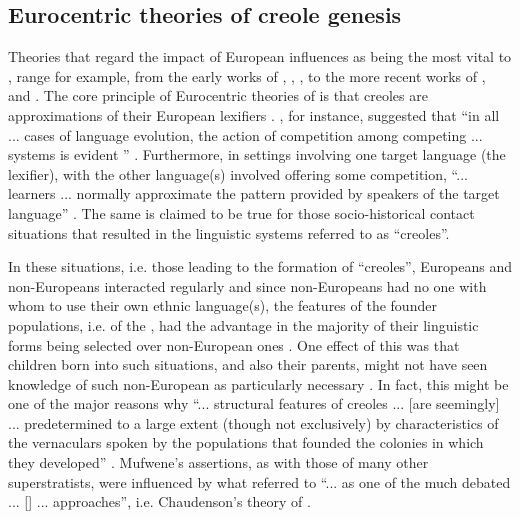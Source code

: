 \subsection {Eurocentric theories of creole genesis} \label{2.2.1}
Theories that regard the impact of European influences as being the most vital to , range for example, from the early works of \citet{Bloomfield33}, \citet{Hall66}, \citet{Ferguson71}, to the more recent works of \citet{Chaudenson92}, and \citet{Mufwene01, Mufwene08, Mufwene08b}. The core principle of Eurocentric theories of  is that creoles are approximations of their European lexifiers \citep[43]{Baker00}.  \citet{Mufwene08}, for instance, suggested that ``in all ... cases of language evolution, the action of competition among competing ... systems is evident '' \citep[58]{Mufwene08}. Furthermore, in  settings involving one target language (the lexifier), with the other language(s) involved offering some competition, ``... learners ... normally approximate the pattern provided by speakers of the target language'' \citep[122]{Mufwene08}. The same is claimed to be true for those socio-historical contact situations that resulted in the linguistic systems referred to as ``creoles''.

In these situations, i.e. those leading to the formation of ``creoles'', Europeans and non-Europeans interacted regularly and since non-Europeans had no one with whom to use their own ethnic language(s), the features of the founder populations, i.e. of the , had the advantage in the majority of their linguistic forms being selected over non-European ones \citep{Mufwene96}. One effect of this was that children born into such situations, and also their parents, might not have seen knowledge of such non-European  as particularly necessary \citep{Mufwene08b}. In fact, this might be one of the major reasons why ``... structural features of creoles ... [are seemingly] ... predetermined to a large extent (though not exclusively) by characteristics of the vernaculars spoken by the populations that founded the colonies in which they developed'' \citep[28]{Mufwene96}. Mufwene's assertions, as with those of many other superstratists, were influenced by what \citep[3]{Braun09} referred to ``... as one of the much debated ... [] ... approaches'', i.e. Chaudenson's \citep{Chaudenson92} theory of .

